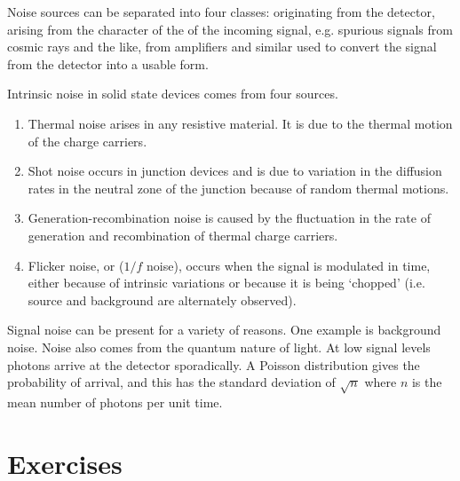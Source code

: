 Noise sources can be separated into four classes: {} 
originating from the detector, {} arising from the character
of the of the incoming signal, {} e.g. spurious signals
from cosmic rays and the like, {} from amplifiers and
similar used to convert the signal from the detector into a usable form.

Intrinsic noise in solid state devices comes from four sources.
\begin{enumerate}
\item Thermal noise arises in any resistive material. It is due to the thermal
motion of the charge carriers. 
\item Shot noise occurs in junction devices and is due to variation in 
the diffusion rates in the neutral zone of the junction because of random
thermal motions. 
\item Generation-recombination noise is caused by the fluctuation in the
rate of generation and recombination of thermal charge carriers. 
\item Flicker noise, or ($1/f$ noise), occurs when the signal is modulated
in time, either because of intrinsic variations or because it is being
`chopped' (i.e. source and background are alternately observed). 
\end{enumerate}

Signal noise can be present for a variety of reasons. One example is
background noise. Noise also comes from the quantum nature of light. At
low signal levels photons arrive at the detector sporadically. A Poisson
distribution gives the probability of arrival, and this has the standard
deviation of $\sqrt{n}$ where $n$ is the mean number of photons per unit
time. 


\section{Exercises}


